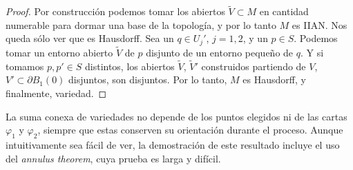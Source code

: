 \documentclass[10pt]{report}
\theoremstyle{definition}
\begin{document}
\begin{proof}
Por construcción podemos tomar los abiertos $\tilde{V} \subset  M$ en cantidad numerable para dormar una base de la topología, y por lo tanto $M$ es IIAN. Nos queda sólo ver que es Hausdorff. Sea un $q\in U_j'$, $j=1,2$, y  un $p\in S$. Podemos tomar un entorno abierto $\tilde{V}$ de $p$ disjunto de un entorno pequeño de $q$. Y si tomamos $p, p' \in S$ distintos, los abiertos $\tilde{V}$, $\tilde{V}'$ construidos partiendo de $V$, $V'\subset \partial B_1(0)$ disjuntos, son disjuntos. Por lo tanto, $M$ es Hausdorff, y finalmente, variedad.

\end{proof}

La suma conexa de variedades no depende de los puntos elegidos ni de las cartas $\varphi_1$ y $\varphi_2$, siempre que estas conserven su orientación durante el proceso. Aunque intuitivamente sea fácil de ver, la demostración de este resultado incluye el uso del \textit{annulus theorem}, cuya prueba es larga y difícil. 


\end{document}

